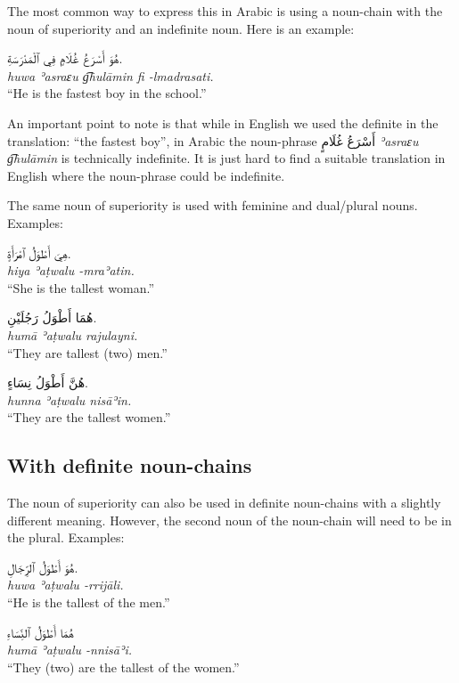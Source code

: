 \documentclass[
  10pt,
]{book}
\begin{document}
The most common way to express this in Arabic is using a noun-chain with the noun of superiority and an indefinite noun. Here is an example:

\foreignlanguage{arabic}{هُوَ أَسْرَعُ غُلَامٍ فِي ٱلْمَدْرَسَةِ.}\\
\emph{huwa ʾasraɛu g͡hulāmin fi -lmadrasati.}\\
\enquote{He is the fastest boy in the school.}

An important point to note is that while in English we used the definite in the translation: \enquote{the fastest boy}, in Arabic the noun-phrase \foreignlanguage{arabic}{أَسْرَعُ غُلَامٍ} \emph{ʾasraɛu g͡hulāmin} is technically indefinite. It is just hard to find a suitable translation in English where the noun-phrase could be indefinite.

The same noun of superiority is used with feminine and dual/plural nouns. Examples:

\foreignlanguage{arabic}{هِيَ أَطْوَلُ ٱمْرَأَةٍ.}\\
\emph{hiya ʾaṭwalu -mraʾatin.}\\
\enquote{She is the tallest woman.}

\foreignlanguage{arabic}{هُمَا أَطْوَلُ رَجُلَيْنِ.}\\
\emph{humā ʾaṭwalu rajulayni.}\\
\enquote{They are tallest (two) men.}

\foreignlanguage{arabic}{هُنَّ أَطْوَلُ نِسَاءٍ.}\\
\emph{hunna ʾaṭwalu nisāʾin.}\\
\enquote{They are the tallest women.}

\subsection{With definite noun-chains}\label{with-definite-noun-chains}

The noun of superiority can also be used in definite noun-chains with a slightly different meaning. However, the second noun of the noun-chain will need to be in the plural. Examples:

\foreignlanguage{arabic}{هُوَ أَطْوَلُ ٱلرِّجَالِ.}\\
\emph{huwa ʾaṭwalu -rrijāli.}\\
\enquote{He is the tallest of the men.}

\foreignlanguage{arabic}{هُمَا أَطْوَلُ ٱلنِّسَاءِ}\\
\emph{humā ʾaṭwalu -nnisāʾi.}\\
\enquote{They (two) are the tallest of the women.}
\end{document}
